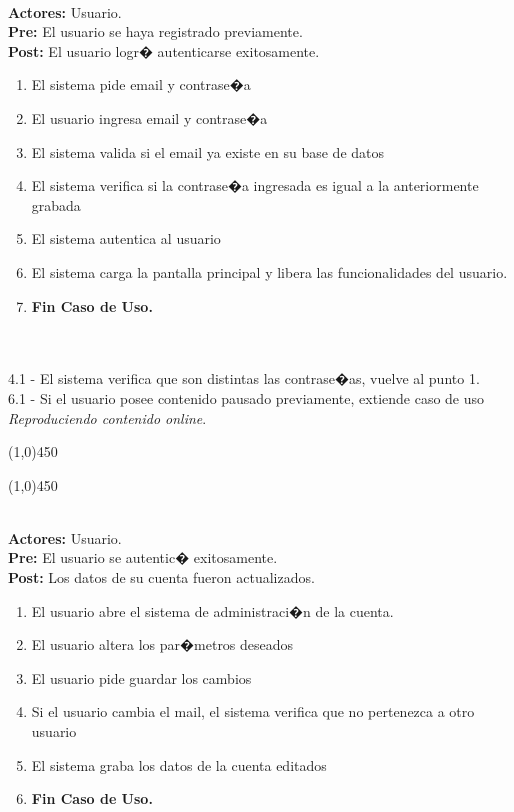 \documentclass[11pt, a4paper, spanish]{article}
\begin{document}
 \\
\textbf{Actores:} Usuario. \\
\textbf{Pre:} El usuario se haya registrado previamente. \\
\textbf{Post:} El usuario logr� autenticarse exitosamente.\\
\begin{enumerate}
	\item El sistema pide email y contrase�a
	\item El usuario ingresa email y contrase�a
	\item El sistema valida si el email ya existe en su base de datos
	\item El sistema verifica si la contrase�a ingresada es igual a la anteriormente grabada
	\item El sistema autentica al usuario
	\item El sistema carga la pantalla principal y libera las funcionalidades del usuario.
	\item \textbf{Fin Caso de Uso.}
\end{enumerate}
 \\
\\
4.1 - El sistema verifica que son distintas las contrase�as, vuelve al punto 1.\\
6.1 - Si el usuario posee contenido pausado previamente, extiende caso de uso \emph{Reproduciendo contenido online}.\\


\begin{center} \line(1,0){450} \end{center}
\newpage
\begin{center} \line(1,0){450} \end{center}



 \\
\textbf{Actores:} Usuario. \\
\textbf{Pre:} El usuario se autentic� exitosamente. \\
\textbf{Post:} Los datos de su cuenta fueron actualizados.\\
\begin{enumerate}
	\item El usuario abre el sistema de administraci�n de la cuenta.
	\item El usuario altera los par�metros deseados
	\item El usuario pide guardar los cambios
	\item Si el usuario cambia el mail, el sistema verifica que no pertenezca a otro usuario
	\item El sistema graba los datos de la cuenta editados
	\item \textbf{Fin Caso de Uso.}
\end{enumerate}
 \\
\end{document}
